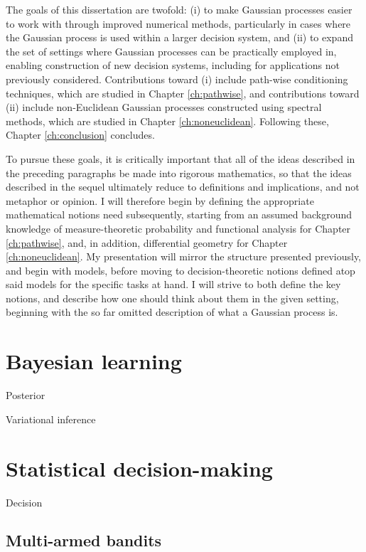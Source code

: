 \documentclass[11pt]{book}
\begin{document}
The goals of this dissertation are twofold: (i) to make Gaussian processes easier to work with through improved numerical methods, particularly in cases where the Gaussian process is used within a larger decision system, and (ii) to expand the set of settings where Gaussian processes can be practically employed in, enabling construction of new decision systems, including for applications not previously considered.
Contributions toward (i) include path-wise conditioning techniques, which are studied in Chapter \ref{ch:pathwise}, and contributions toward (ii) include non-Euclidean Gaussian processes constructed using spectral methods, which are studied in Chapter \ref{ch:noneuclidean}.
Following these, Chapter \ref{ch:conclusion} concludes.

To pursue these goals, it is critically important that all of the ideas described in the preceding paragraphs be made into rigorous mathematics, so that the ideas described in the sequel ultimately reduce to definitions and implications, and not metaphor or opinion.
I will therefore begin by defining the appropriate mathematical notions need subsequently, starting from an assumed background knowledge of measure-theoretic probability and functional analysis for Chapter \ref{ch:pathwise}, and, in addition, differential geometry for Chapter \ref{ch:noneuclidean}.
My presentation will mirror the structure presented previously, and begin with models, before moving to decision-theoretic notions defined atop said models for the specific tasks at hand.
I will strive to both define the key notions, and describe how one should think about them in the given setting, beginning with the so far omitted description of what a Gaussian process is.



\section{Bayesian learning}

Posterior

Variational inference

\section{Statistical decision-making}

Decision

\subsection{Multi-armed bandits}
\end{document}
